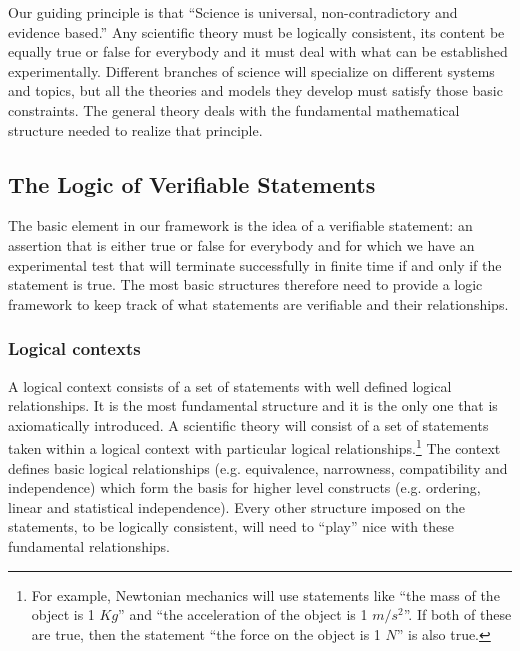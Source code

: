 \documentclass[twocolumn]{article}
\newif\ifextended
\newcommand\fact[2]{\ifextended \emph{#1}. #2 \fi}
\begin{document}
Our guiding principle is that ``Science is universal, non-contradictory and evidence based.'' Any scientific theory must be logically consistent, its content be equally true or false for everybody and it must deal with what can be established experimentally. Different branches of science will specialize on different systems and topics, but all the theories and models they develop must satisfy those basic constraints. The general theory deals with the fundamental mathematical structure needed to realize that principle. 

\fact{Not every subject can be studied by science} {The principle indirectly states that anything that is subjective, contradictory or not evidence based cannot be the subject of scientific investigation. The properties of prime numbers, moral and existential questions or the aesthetics of music fail in at least one of those respects and are excluded. Only the parts of nature that are accessible through consistent experimental verification can be studied scientifically. New experimental techniques have been extending that reach over time.}

\subsection{The Logic of Verifiable Statements}

The basic element in our framework is the idea of a verifiable statement: an assertion that is either true or false for everybody and for which we have an experimental test that will terminate successfully in finite time if and only if the statement is true. The most basic structures therefore need to provide a logic framework to keep track of what statements are verifiable and their relationships.

\subsubsection{Logical contexts}

A logical context consists of a set of statements with well defined logical relationships. It is the most fundamental structure and it is the only one that is axiomatically introduced.  A scientific theory will consist of a set of statements taken within a logical context with particular logical relationships.\footnote{For example, Newtonian mechanics will use statements like ``the mass of the object is 1 $Kg$'' and ``the acceleration of the object is 1 $m/s^2$''. If both of these are true, then the statement ``the force on the object is  1 $N$'' is also true.} The context defines basic logical relationships (e.g. equivalence, narrowness, compatibility and independence) which form the basis for higher level constructs (e.g. ordering, linear and statistical independence). Every other structure imposed on the statements, to be logically consistent, will need to ``play'' nice with these fundamental relationships.
\end{document}

